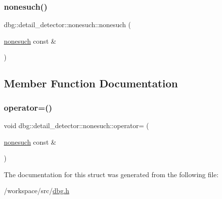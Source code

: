 \subsubsection{\texorpdfstring{nonesuch()}{nonesuch()}\hspace{0.1cm}{\footnotesize\ttfamily [2/2]}}
{\footnotesize\ttfamily dbg\+::detail\+\_\+detector\+::nonesuch\+::nonesuch (\begin{DoxyParamCaption}\item[{\hyperlink{structdbg_1_1detail__detector_1_1nonesuch}{nonesuch} const \&}]{ }\end{DoxyParamCaption})\hspace{0.3cm}{\ttfamily [delete]}}



\subsection{Member Function Documentation}
\mbox{\label{structdbg_1_1detail__detector_1_1nonesuch_af0d1b2ab32ace678e2c9d95684d1917b}} 
\subsubsection{\texorpdfstring{operator=()}{operator=()}}
{\footnotesize\ttfamily void dbg\+::detail\+\_\+detector\+::nonesuch\+::operator= (\begin{DoxyParamCaption}\item[{\hyperlink{structdbg_1_1detail__detector_1_1nonesuch}{nonesuch} const \&}]{ }\end{DoxyParamCaption})\hspace{0.3cm}{\ttfamily [delete]}}



The documentation for this struct was generated from the following file\+:\begin{DoxyCompactItemize}
\item 
/workspace/src/\hyperlink{dbg_8h}{dbg.\+h}\end{DoxyCompactItemize}
